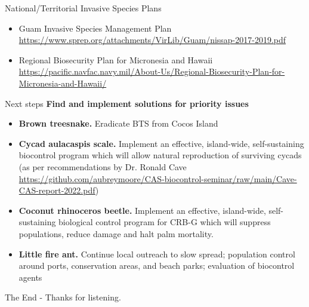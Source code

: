 \documentclass[]{beamer}
\begin{document}
\begin{frame}{National/Territorial Invasive Species Plans}
	\begin{itemize}
		\item Guam Invasive Species Management Plan \url{https://www.sprep.org/attachments/VirLib/Guam/nissap-2017-2019.pdf}
		\item Regional Biosecurity Plan for Micronesia and Hawaii
		\url{https://pacific.navfac.navy.mil/About-Us/Regional-Biosecurity-Plan-for-Micronesia-and-Hawaii/}
	\end{itemize}	
\end{frame}

\begin{frame}{Next steps}
	\textbf{Find and implement solutions for priority issues}
	\begin{itemize}
		\item \textbf{Brown treesnake.} Eradicate BTS from Cocos Island
		\item \textbf{Cycad aulacaspis scale.} Implement an effective, island-wide, self-sustaining biocontrol program which will allow natural reproduction of surviving cycads (as per recommendations by Dr. Ronald Cave \url{https://github.com/aubreymoore/CAS-biocontrol-seminar/raw/main/Cave-CAS-report-2022.pdf})
		\item \textbf{Coconut rhinoceros beetle.} Implement an effective, island-wide, self-sustaining biological control program for CRB-G which will suppress populations, reduce damage and halt palm mortality.
		\item \textbf{Little fire ant.} Continue local outreach to slow spread; population control around ports, conservation areas, and beach parks; evaluation of biocontrol agents
	\end{itemize}

\end{frame}

\begin{frame}{The End - Thanks for listening.}
\end{frame}
\end{document}
